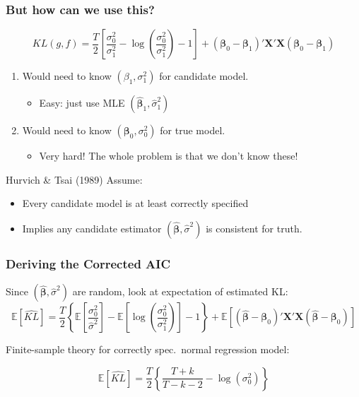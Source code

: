 \begin{frame}
  \frametitle{But how can we use this?}
  \vspace{-1em}
      \[
        KL(g,f) = \frac{T}{2}\left[ \frac{\sigma_0^2}{\sigma_1^2} - \log \left( \frac{\sigma_0^2}{\sigma_1^2} \right) - 1\right] + (\boldsymbol{\beta}_0 - \boldsymbol{\beta}_1)' \mathbf{X}'\mathbf{X} (\boldsymbol{\beta}_0 - \boldsymbol{\beta}_1)
      \]
      \vspace{-1em}
      \begin{enumerate}
        \item Would need to know $(\beta_1, \sigma_1^2)$ for \alert{candidate model}.
          \begin{itemize}
            \item Easy: just use MLE $(\widehat{\boldsymbol{\beta}}_1, \widehat{\sigma}_1^2)$
          \end{itemize}
        \item Would need to know $(\boldsymbol{\beta}_0, \sigma_0^2)$ for \alert{true model}.
          \begin{itemize}
            \item Very hard! The whole problem is that we don't know these!
          \end{itemize}
      \end{enumerate}

      \pause

      \begin{block}{Hurvich \& Tsai (1989) Assume:}
        \vspace{-0.5em}
        \begin{itemize}
          \item Every candidate model is \alert{at least correctly specified}
          \item Implies any candidate estimator $(\widehat{\boldsymbol{\beta}}, \widehat{\sigma}^2)$ is consistent for truth.
        \end{itemize}

      \end{block}
\end{frame}
\begin{frame}
  \frametitle{Deriving the Corrected AIC} 
  Since $(\widehat{\boldsymbol{\beta}}, \widehat{\sigma}^2)$ are random, look at \alert{expectation of estimated KL}:
  \small
      \[
        \mathbb{E}[\widehat{KL}] = \frac{T}{2}\left\{ \mathbb{E}\left[\frac{\sigma_0^2}{\widehat{\sigma}^2}\right] - \mathbb{E}\left[\log \left( \frac{\sigma_0^2}{\sigma_1^2} \right)\right] - 1\right\} + \mathbb{E}\left[ (\widehat{\boldsymbol{\beta}} - \boldsymbol{\beta}_0)' \mathbf{X}'\mathbf{X} (\widehat{\boldsymbol{\beta}} - \boldsymbol{\beta}_0)\right]
      \]

      \normalsize
      \vspace{1em}
  Finite-sample theory for correctly spec.\ normal regression model:

  \[
    \mathbb{E}\left[ \widehat{KL} \right] = \frac{T}{2}\left\{ \frac{T + k}{T-k-2} - \log(\sigma_0^2) \right\}
  \]

\end{frame}
